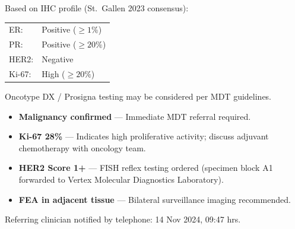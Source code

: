 \documentclass[11pt,a4paper]{article}
\newcommand{\critmarker}{\textcolor{PathRed}{\faExclamationCircle}}
\begin{document}
\begin{minipage}[t]{0.485\linewidth}
\begin{tcolorbox}[sectionbox, title={\faDna\quad Surrogate Molecular Subtype}]
  \setlength{\parskip}{5pt}
  Based on IHC profile (St.\ Gallen 2023 consensus):

  \vspace{4pt}
  \begin{center}
  \end{center}

  \vspace{4pt}
  {\small
  \begin{tabular}{@{}ll@{}}
    ER: & Positive ($\geq 1\%$) \\
    PR: & Positive ($\geq 20\%$) \\
    HER2: & Negative \\
    Ki-67: & High ($\geq 20\%$) \\
  \end{tabular}}

  \vspace{4pt}
  {\footnotesize\color{PathMidGray}
  Oncotype DX / Prosigna testing may be considered per MDT guidelines.}
\end{tcolorbox}
\end{minipage}%
\hfill
\begin{minipage}[t]{0.485\linewidth}
\begin{tcolorbox}[critbox, title={\faExclamationTriangle\quad Critical / Actionable Findings}]
  \setlength{\parskip}{5pt}
  \begin{itemize}[leftmargin=1.4em, itemsep=3pt, topsep=2pt]
    \item[\critmarker] \textbf{Malignancy confirmed} --- Immediate MDT referral required.
    \item[\critmarker] \textbf{Ki-67 28\%{}} --- Indicates high proliferative activity; discuss
          adjuvant chemotherapy with oncology team.
    \item[\critmarker] \textbf{HER2 Score 1+} --- FISH reflex testing ordered (specimen block A1
          forwarded to Vertex Molecular Diagnostics Laboratory).
    \item[\critmarker] \textbf{FEA in adjacent tissue} --- Bilateral surveillance imaging recommended.
  \end{itemize}
  \vspace{2pt}
  {\footnotesize\color{PathRed!80!black}%
  Referring clinician notified by telephone: 14 Nov 2024, 09:47 hrs.}
\end{tcolorbox}
\end{minipage}
\end{document}
